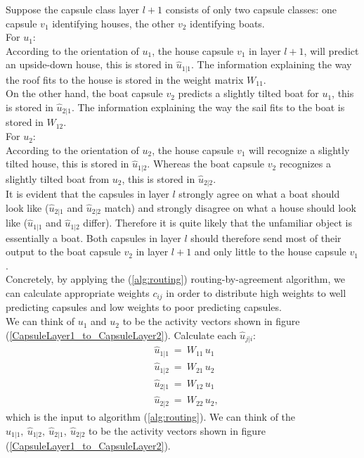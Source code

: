 \documentclass{article}
\begin{document}
{Suppose the capsule class layer $l+1$ consists of only two capsule classes: one capsule $v_1$ identifying houses, the other $v_2$ identifying boats.\\
For $u_1$:\\
According to the orientation of $u_1$, the house capsule $v_1$ in layer $l+1$, will predict an upside-down house, this is stored in $\hat{u}_{1|1}$. The information explaining the way the roof fits to the house is stored in the weight matrix $W_{11}$.\\
On the other hand, the boat capsule $v_2$ predicts a slightly tilted boat for $u_1$, this is stored in $\hat{u}_{2|1}$. The information explaining the way the sail fits to the boat is stored in $W_{12}$.\\
For $u_2$:\\
According to the orientation of $u_2$, the house capsule $v_1$ will recognize a slightly tilted house, this is stored in $\hat{u}_{1|2}$. Whereas the boat capsule $v_2$ recognizes a slightly tilted boat from $u_2$, this is stored in $\hat{u}_{2|2}$.\\
It is evident that the capsules in layer $l$ strongly agree on what a boat should look like ($\hat{u}_{2|1}$ and $\hat{u}_{2|2}$ match) and strongly disagree on what a house should look like ($\hat{u}_{1|1}$ and $\hat{u}_{1|2}$ differ). Therefore it is quite likely that the unfamiliar object is essentially a boat. Both capsules in layer $l$ should therefore send most of their output to the boat capsule $v_2$ in layer $l+1$ and only little to the house capsule $v_1$.\\
Concretely, by applying the (\ref{alg:routing}) routing-by-agreement algorithm, we can calculate appropriate weights $c_{ij}$ in order to distribute high weights to well predicting capsules and low weights to poor predicting capsules.\\
We can think of $u_1$ and $u_2$ to be the activity vectors shown in figure (\ref{CapsuleLayer1_to_CapsuleLayer2}).
Calculate each $\hat{u}_{j|i}$:
\begin{align*}
&\hat{u}_{1|1} \ = \ W_{11} \, u_1 \\
&\hat{u}_{1|2} \ = \ W_{21} \, u_2 \\
&\hat{u}_{2|1} \ = \ W_{12} \, u_1 \\
&\hat{u}_{2|2} \ = \ W_{22} \, u_2,
\end{align*}
which is the input to algorithm (\ref{alg:routing}).
We can think of the $\hat{u}_{1|1}, \ \hat{u}_{1|2}, \ \hat{u}_{2|1}, \ \hat{u}_{2|2}$ to be the activity vectors shown in figure (\ref{CapsuleLayer1_to_CapsuleLayer2}).
}
\end{document}
